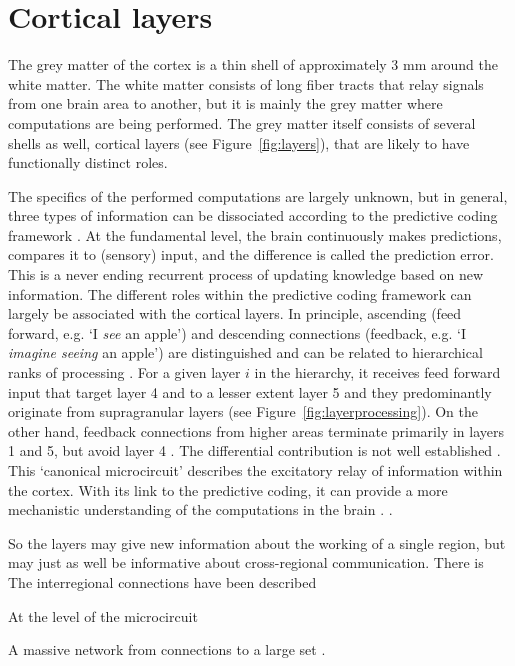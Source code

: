 \section*{Cortical layers}
The grey matter of the cortex is a thin shell of approximately 3 mm \cite{Zilles1990} around the white matter. The white matter consists of long fiber tracts that relay signals from one brain area to another, but it is mainly the grey matter where computations are being performed. The grey matter itself consists of several shells as well, cortical layers (see Figure~\ref{fig:layers}), that are likely to have functionally distinct roles.

The specifics of the performed computations are largely unknown, but in general, three types of information can be dissociated according to the predictive coding framework \cite{Friston2010}. At the fundamental level, the brain continuously makes predictions, compares it to (sensory) input, and the difference is called the prediction error. This is a never ending recurrent process of updating knowledge based on new information. The different roles within the predictive coding framework can largely be associated with the cortical layers. In principle, ascending (feed forward, e.g. `I \emph{see} an apple') and descending connections (feedback, e.g. `I \emph{imagine seeing} an apple') are distinguished \cite{Rockland1979} and can be related to hierarchical ranks of processing \cite{Barone2000}. For a given layer $i$ in the hierarchy, it receives feed forward input that target layer 4 and to a lesser extent layer 5 \cite{Constantinople2013} and they predominantly originate from supragranular layers (see Figure~\ref{fig:layerprocessing}). On the other hand, feedback connections from higher areas terminate primarily in layers 1 and 5, but avoid layer 4 \cite{Anderson2009}. The differential contribution is not well established \cite{Shipp2013}. This `canonical microcircuit' describes the excitatory relay of information within the cortex. With its link to the predictive coding, it can provide a more mechanistic understanding of the computations in the brain \cite{Shipp2016}.
.

So the layers may give new information about the working of a single region, but may just as well be informative about cross-regional communication. There is 
The interregional connections have been described 

At the level of the microcircuit 

A massive network from connections to a large set 
\cite{Felleman1991}.



